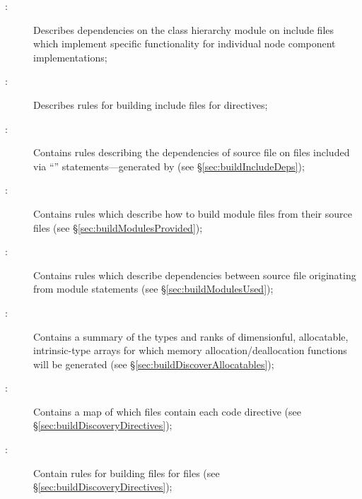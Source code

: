 \begin{description}
\item[:] Describes dependencies on the  class hierarchy module on include files which implement specific functionality for individual node component implementations;
  
\item[:] Describes rules for building include files for  directives;

\item[:] Contains rules describing the dependencies of source file on files included via ``'' statements---generated by  (see \S\ref{sec:buildIncludeDeps});

\item[:] Contains rules which describe how to build module files from their source files (see \S\ref{sec:buildModulesProvided});

\item[:] Contains rules which describe dependencies between source file originating from module  statements (see \S\ref{sec:buildModulesUsed});

\item[:] Contains a summary of the types and ranks of dimensionful, allocatable, intrinsic-type arrays for which memory allocation/deallocation functions will be generated (see \S\ref{sec:buildDiscoverAllocatables});

\item[:] Contains a map of which files contain each code directive (see \S\ref{sec:buildDiscoveryDirectives});

\item[:] Contain rules for building files for  files (see \S\ref{sec:buildDiscoveryDirectives});


\end{description}
